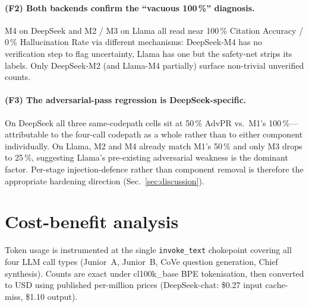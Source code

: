 \documentclass{article}
\begin{document}
\paragraph{(F2) Both backends confirm the ``vacuous 100\,\%'' diagnosis.}
M4 on DeepSeek and M2 / M3 on Llama all read near 100\,\% Citation
Accuracy / 0\,\% Hallucination Rate via different mechanisms:
DeepSeek-M4 has no verification step to flag uncertainty, Llama has
one but the safety-net strips its labels. Only DeepSeek-M2 (and
Llama-M4 partially) surface non-trivial unverified counts.

\paragraph{(F3) The adversarial-pass regression is DeepSeek-specific.}
On DeepSeek all three same-codepath cells sit at 50\,\% AdvPR vs.\
M1's 100\,\%---attributable to the four-call codepath as a whole
rather than to either component individually. On Llama, M2 and M4
already match M1's 50\,\% and only M3 drops to 25\,\%, suggesting
Llama's pre-existing adversarial weakness is the dominant factor.
Per-stage injection-defence rather than component removal is
therefore the appropriate hardening direction
(Sec.~\ref{sec:discussion}).

\section{Cost-benefit analysis}
\label{sec:cost}

Token usage is instrumented at the single \texttt{invoke\_text}
chokepoint covering all four LLM call types
(Junior~A, Junior~B, CoVe question generation, Chief synthesis).
Counts are exact under cl100k\_base
BPE tokenisation, then converted to USD using published per-million
prices (DeepSeek-chat: \$0.27 input cache-miss, \$1.10 output).
\end{document}
